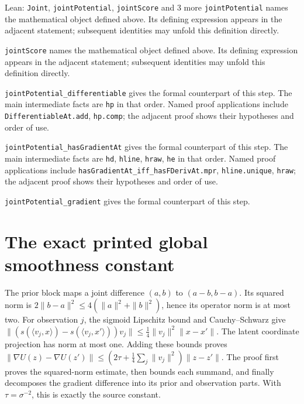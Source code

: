 \documentclass[11pt,a4paper]{article}
\begin{document}
\begin{leanbox}{Lean: \texttt{Joint}, \texttt{jointPotential}, \texttt{jointScore} and 3 more}
\texttt{joint\allowbreak{}Potential} names the mathematical object defined above. Its defining expression appears in the adjacent statement; subsequent identities may unfold this definition directly.




\texttt{joint\allowbreak{}Score} names the mathematical object defined above. Its defining expression appears in the adjacent statement; subsequent identities may unfold this definition directly.




\texttt{joint\allowbreak{}Potential\_\allowbreak{}differentiable} gives the formal counterpart of this step. The main intermediate facts are \texttt{hp} in that order. Named proof applications include \texttt{Differentiable\allowbreak{}At.\allowbreak{}add}, \texttt{hp.\allowbreak{}comp}; the adjacent proof shows their hypotheses and order of use.




\texttt{joint\allowbreak{}Potential\_\allowbreak{}has\allowbreak{}Gradient\allowbreak{}At} gives the formal counterpart of this step. The main intermediate facts are \texttt{hd}, \texttt{hline}, \texttt{hraw}, \texttt{he} in that order. Named proof applications include \texttt{has\allowbreak{}Gradient\allowbreak{}At\_\allowbreak{}iff\_\allowbreak{}has\allowbreak{}FDeriv\allowbreak{}At.\allowbreak{}mpr}, \texttt{hline.\allowbreak{}unique}, \texttt{hraw}; the adjacent proof shows their hypotheses and order of use.




\texttt{joint\allowbreak{}Potential\_\allowbreak{}gradient} gives the formal counterpart of this step.
\end{leanbox}

\section{\texorpdfstring{The exact printed global smoothness constant}{The exact printed global smoothness constant}}


The prior block maps a joint difference \((a,b)\) to \((a-b,b-a)\). Its squared norm is \(2\|b-a\|^2\le4(\|a\|^2+\|b\|^2)\), hence its operator norm is at most two. For observation \(j\), the sigmoid Lipschitz bound and Cauchy–Schwarz give \(\|(s(\langle v_j,x\rangle)-s(\langle v_j,x'\rangle))v_j\|\le\frac14\|v_j\|^2\|x-x'\|\). The latent coordinate projection has norm at most one. Adding these bounds proves \(\|\nabla U(z)-\nabla U(z')\|\le(2\tau+\frac14\sum_j\|v_j\|^2)\|z-z'\|\). The proof first proves the squared-norm estimate, then bounds each summand, and finally decomposes the gradient difference into its prior and observation parts. With \(\tau=\sigma^{-2}\), this is exactly the source constant.
\end{document}
